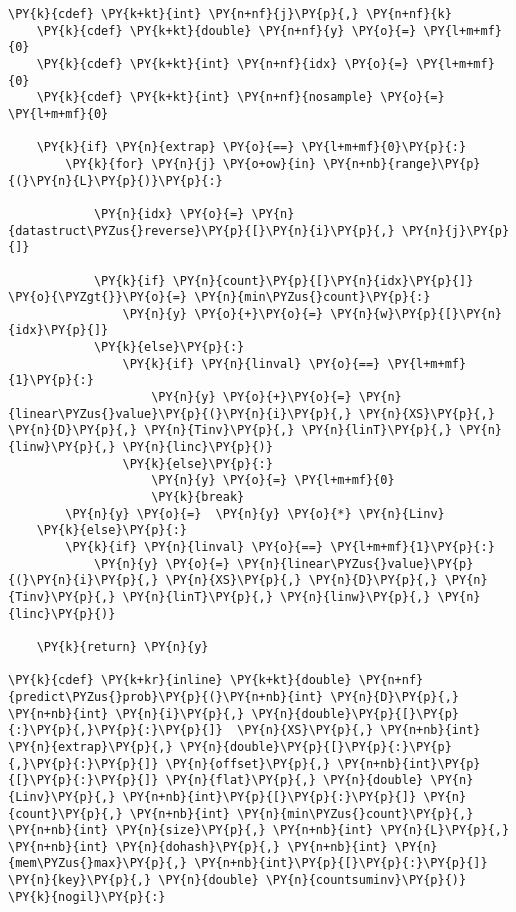 \begin{Verbatim}[commandchars=\\\{\}]
    \PY{k}{cdef} \PY{k+kt}{int} \PY{n+nf}{j}\PY{p}{,} \PY{n+nf}{k}
    \PY{k}{cdef} \PY{k+kt}{double} \PY{n+nf}{y} \PY{o}{=} \PY{l+m+mf}{0}
    \PY{k}{cdef} \PY{k+kt}{int} \PY{n+nf}{idx} \PY{o}{=} \PY{l+m+mf}{0}
    \PY{k}{cdef} \PY{k+kt}{int} \PY{n+nf}{nosample} \PY{o}{=} \PY{l+m+mf}{0}

    \PY{k}{if} \PY{n}{extrap} \PY{o}{==} \PY{l+m+mf}{0}\PY{p}{:}
        \PY{k}{for} \PY{n}{j} \PY{o+ow}{in} \PY{n+nb}{range}\PY{p}{(}\PY{n}{L}\PY{p}{)}\PY{p}{:} 
        
            \PY{n}{idx} \PY{o}{=} \PY{n}{datastruct\PYZus{}reverse}\PY{p}{[}\PY{n}{i}\PY{p}{,} \PY{n}{j}\PY{p}{]}
           
            \PY{k}{if} \PY{n}{count}\PY{p}{[}\PY{n}{idx}\PY{p}{]} \PY{o}{\PYZgt{}}\PY{o}{=} \PY{n}{min\PYZus{}count}\PY{p}{:}
                \PY{n}{y} \PY{o}{+}\PY{o}{=} \PY{n}{w}\PY{p}{[}\PY{n}{idx}\PY{p}{]}
            \PY{k}{else}\PY{p}{:}
                \PY{k}{if} \PY{n}{linval} \PY{o}{==} \PY{l+m+mf}{1}\PY{p}{:}
                    \PY{n}{y} \PY{o}{+}\PY{o}{=} \PY{n}{linear\PYZus{}value}\PY{p}{(}\PY{n}{i}\PY{p}{,} \PY{n}{XS}\PY{p}{,} \PY{n}{D}\PY{p}{,} \PY{n}{Tinv}\PY{p}{,} \PY{n}{linT}\PY{p}{,} \PY{n}{linw}\PY{p}{,} \PY{n}{linc}\PY{p}{)}
                \PY{k}{else}\PY{p}{:}
                    \PY{n}{y} \PY{o}{=} \PY{l+m+mf}{0}
                    \PY{k}{break}
        \PY{n}{y} \PY{o}{=}  \PY{n}{y} \PY{o}{*} \PY{n}{Linv}
    \PY{k}{else}\PY{p}{:}
        \PY{k}{if} \PY{n}{linval} \PY{o}{==} \PY{l+m+mf}{1}\PY{p}{:}
            \PY{n}{y} \PY{o}{=} \PY{n}{linear\PYZus{}value}\PY{p}{(}\PY{n}{i}\PY{p}{,} \PY{n}{XS}\PY{p}{,} \PY{n}{D}\PY{p}{,} \PY{n}{Tinv}\PY{p}{,} \PY{n}{linT}\PY{p}{,} \PY{n}{linw}\PY{p}{,} \PY{n}{linc}\PY{p}{)}
    
    \PY{k}{return} \PY{n}{y}

\PY{k}{cdef} \PY{k+kr}{inline} \PY{k+kt}{double} \PY{n+nf}{predict\PYZus{}prob}\PY{p}{(}\PY{n+nb}{int} \PY{n}{D}\PY{p}{,} \PY{n+nb}{int} \PY{n}{i}\PY{p}{,} \PY{n}{double}\PY{p}{[}\PY{p}{:}\PY{p}{,}\PY{p}{:}\PY{p}{]}  \PY{n}{XS}\PY{p}{,} \PY{n+nb}{int} \PY{n}{extrap}\PY{p}{,} \PY{n}{double}\PY{p}{[}\PY{p}{:}\PY{p}{,}\PY{p}{:}\PY{p}{]} \PY{n}{offset}\PY{p}{,} \PY{n+nb}{int}\PY{p}{[}\PY{p}{:}\PY{p}{]} \PY{n}{flat}\PY{p}{,} \PY{n}{double} \PY{n}{Linv}\PY{p}{,} \PY{n+nb}{int}\PY{p}{[}\PY{p}{:}\PY{p}{]} \PY{n}{count}\PY{p}{,} \PY{n+nb}{int} \PY{n}{min\PYZus{}count}\PY{p}{,} \PY{n+nb}{int} \PY{n}{size}\PY{p}{,} \PY{n+nb}{int} \PY{n}{L}\PY{p}{,}  \PY{n+nb}{int} \PY{n}{dohash}\PY{p}{,} \PY{n+nb}{int} \PY{n}{mem\PYZus{}max}\PY{p}{,} \PY{n+nb}{int}\PY{p}{[}\PY{p}{:}\PY{p}{]} \PY{n}{key}\PY{p}{,} \PY{n}{double} \PY{n}{countsuminv}\PY{p}{)} \PY{k}{nogil}\PY{p}{:}


\end{Verbatim}
